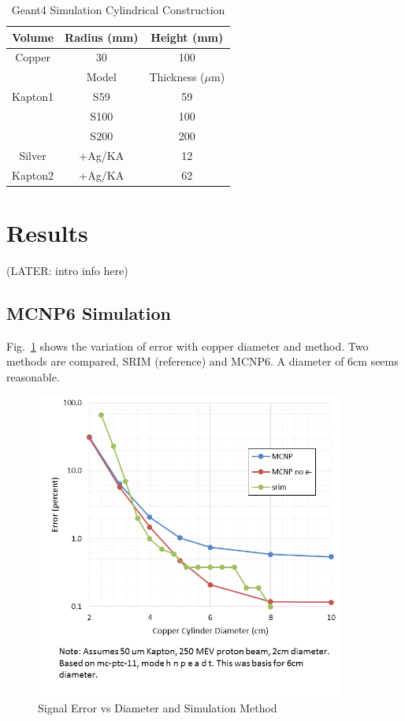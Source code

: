\documentclass{mc2015}
\begin{document}
\begin{table}
  \centering
  \caption{Geant4 Simulation Cylindrical Construction}
  \begin{tabular}{ccc}
    \toprule
    Volume  & Radius (mm) & Height (mm) \\
    \midrule
    Copper  & \num{30} & \num{100} \\
    \toprule\toprule
            & Model    & Thickness ($\mu$m) \\
    \midrule
    Kapton1 & S59      & \num{59}  \\
            & S100     & \num{100} \\
            & S200     & \num{200} \\
    Silver  & +Ag/KA   & \num{12}  \\
    Kapton2 & +Ag/KA   & \num{62}  \\
    \bottomrule
  \end{tabular}
  \label{tab:geant4setup}
\end{table}


\section{Results}

(LATER: intro info here)

\subsection{MCNP6 Simulation}

Fig.~\ref{fig:error_diameter} shows the variation of error with copper diameter and method. Two methods are compared, SRIM (reference) and MCNP6. A diameter of 6cm seems reasonable.

\begin{figure}[H]
  \centering
  \includegraphics[width=4in]{figures/fig_error_diameter.png}
  \caption{Signal Error vs Diameter and Simulation Method}
  \label{fig:error_diameter}
\end{figure}
\end{document}
